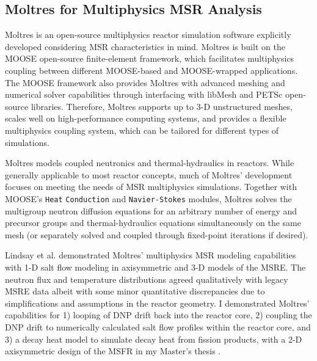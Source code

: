 \subsection{Moltres for Multiphysics \gls{MSR} Analysis}

Moltres \cite{lindsay_moltres_2017} is an open-source multiphysics reactor simulation software
explicitly developed considering \gls{MSR} characteristics in mind. Moltres is
built on the \gls{MOOSE} \cite{permann_moose_2020} open-source finite-element framework,
which facilitates multiphysics coupling between different
\gls{MOOSE}-based and \gls{MOOSE}-wrapped applications. The \gls{MOOSE} framework also provides
Moltres with advanced meshing and numerical solver capabilities through interfacing with libMesh
\cite{kirk_libmesh_2006} and PETSc \cite{satish_petsc_2019} open-source libraries. Therefore,
Moltres supports up to 3-D unstructured meshes, scales well on high-performance computing systems,
and provides a flexible multiphysics coupling system, which can be tailored for different types of
simulations.

Moltres models coupled neutronics and thermal-hydraulics in reactors. While
generally applicable to most reactor concepts, much of
Moltres' development focuses on meeting the needs of \gls{MSR} multiphysics simulations.
Together with \gls{MOOSE}'s \texttt{Heat}
\texttt{Conduction} and \texttt{Navier-Stokes} \cite{peterson_overview_2018}
modules, Moltres solves the multigroup neutron diffusion
equations for an arbitrary number of energy and precursor groups and
thermal-hydraulics equations simultaneously on the same mesh (or separately solved and coupled
through fixed-point iterations if desired).

Lindsay et al. \cite{lindsay_introduction_2018}
demonstrated Moltres' multiphysics \gls{MSR} modeling capabilities with 1-D salt
flow modeling in axisymmetric and 3-D models of the \gls{MSRE}. The neutron flux and
temperature distributions agreed qualitatively with legacy
\gls{MSRE} data albeit with some minor quantitative discrepancies due to
simplifications and assumptions in the reactor geometry. I demonstrated Moltres' capabilities for
1) looping of \gls{DNP} drift back into the reactor core, 2) coupling the \gls{DNP}
drift to numerically calculated salt flow profiles within the reactor core,
and 3) a decay heat model to simulate decay heat from fission products, with a 2-D axisymmetric
design of the \gls{MSFR} in my Master's thesis \cite{park_advancement_2020}.

